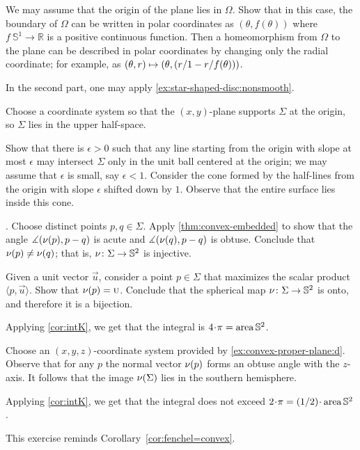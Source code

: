 We may assume that the origin of the plane lies in $\Omega$.
Show that in this case, the boundary of $\Omega$ can be written in polar coordinates as $(\theta,f(\theta))$ where $f\:\mathbb{S}^1\to\mathbb{R}$ is a positive continuous function.
Then a homeomorphism from $\Omega$ to the plane can be described in polar coordinates by changing only the radial coordinate;
for example, as 
$(\theta,r)\z\mapsto (\theta,
\tfrac{r}{1-r/f(\theta)})$.

In the second part, one may apply \ref{ex:star-shaped-disc:nonsmooth}.

Choose a coordinate system so that the $(x,y)$-plane supports $\Sigma$ at the origin, so $\Sigma$ lies in the upper half-space. 

Show that there is $\epsilon>0$ such that any line starting from the origin with slope at most $\epsilon$ may intersect $\Sigma$ only in the unit ball centered at the origin;
we may assume that $\epsilon$ is small, say $\epsilon<1$.
Consider the cone formed by the half-lines from the origin with slope $\epsilon$ shifted down by $1$.
Observe that the entire surface lies inside this cone.

\parbf{\ref{ex:intK}}.
Choose distinct points $p,q\in\Sigma$.
Apply \ref{thm:convex-embedded} to show that the angle 
$\measuredangle(\nu(p),p-q)$ is acute and $\measuredangle(\nu(q),p-q)$ is obtuse.
Conclude that $\nu(p)\ne\nu(q)$;
that is, $\nu\colon\Sigma\to\mathbb{S}^2$ is injective.

Given a unit vector $\vec u$, consider a point $p\in \Sigma$ that maximizes the scalar product $\langle p,\vec u\rangle$.
Show that $\nu(p)=\text{\sc{u}}$.
Conclude that the spherical map $\nu\colon\Sigma\to\mathbb{S}^2$ is onto, and therefore it is a bijection.

Applying \ref{cor:intK}, we get that the integral is $4\cdot\pi=\area\mathbb{S}^2$.

 Choose an $(x,y,z)$-coordinate system provided by \ref{ex:convex-proper-plane:d}.
Observe that for any $p$ the normal vector $\nu(p)$ forms an obtuse angle with the $z$-axis.
It follows that the image $\nu(\Sigma)$ lies in the southern hemisphere.

Applying \ref{cor:intK}, we get that the integral does not exceed $2\cdot\pi=\tfrac12\cdot\area\mathbb{S}^2$.

 This exercise reminds Corollary~\ref{cor:fenchel=convex}.

